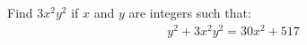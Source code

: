 Find $3x^{2}y^{2}$ if $x$ and $y$ are integers such that:
\begin{align*}
y^{2} + 3x^{2}y^{2} = 30x^{2} + 517
\end{align*}